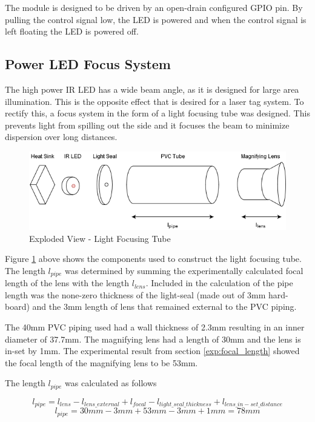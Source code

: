 The module is designed to be driven by an open-drain configured GPIO pin. By pulling the control signal low, the LED is powered and when the control signal is left floating the LED is powered off.

\subsection{Power LED Focus System}

The high power IR LED has a wide beam angle, as it is designed for large area illumination. This is the opposite effect that is desired for a laser tag system. To rectify this, a focus system in the form of a light focusing tube was designed. This prevents light from spilling out the side and it focuses the beam to minimize dispersion over long distances.

\begin{figure}[H]
	\centering
	\includegraphics[width=.8\textwidth]{figures/design/beam_tube.png}
	\caption{Exploded View - Light Focusing Tube}
	\label{fig:light_focusing_tube}
\end{figure}

Figure \ref{fig:light_focusing_tube} above shows the components used to construct the light focusing tube. The length $l_{pipe}$ was determined by summing the experimentally calculated focal length of the lens with the length $l_{lens}$. Included in the calculation of the pipe length was the none-zero thickness of the light-seal (made out of 3mm hard-board) and the 3mm length of lens that remained external to the PVC piping.

The 40mm PVC piping used had a wall thickness of 2.3mm resulting in an inner diameter of 37.7mm. The magnifying lens had a length of 30mm and the lens is in-set by 1mm. The experimental result from section \ref{exp:focal_length} showed the focal length of the magnifying lens to be 53mm.

The length $l_{pipe}$ was calculated as follows

\[l_{pipe} = l_{lens} - l_{lens\_external} + l_{focal} - l_{light\_seal\_thickness} + l_{lens\_in-set\_distance}\]
\[l_{pipe} = 30mm - 3mm + 53mm - 3mm + 1mm = 78mm\]

